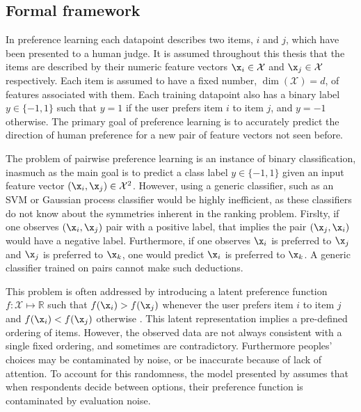 
\subsection{Formal framework\label{sec:prefKernel}}

In preference learning each datapoint describes two items, $i$ and $j$, which have been presented to a human judge. It is assumed throughout this thesis that the items are described by their numeric feature vectors $\x_i\in\mathcal{X}$ and $\x_j\in\mathcal{X}$ respectively. Each item is assumed to have a fixed number, $\dim(\mathcal{X})=d$, of features associated with them. Each training datapoint also has a binary label $y\in\{-1,1\}$ such that $y=1$ if the user prefers item $i$ to item $j$, and $y=-1$ otherwise. The primary goal of preference learning is to accurately predict the direction of human preference for a new pair of feature vectors not seen before.

The problem of pairwise preference learning is an instance of binary classification, inasmuch as the main goal is to predict a class label $y\in\{-1,1\}$ given an input feature vector $(\x_i,\x_j)\in\mathcal{X}^2$. However, using a generic classifier, such as an SVM or Gaussian process classifier would be highly inefficient, as these classifiers do not know about the symmetries inherent in the ranking problem. Firslty, if one observes $(\x_i,\x_j)$ pair with a positive label, that implies the pair $(\x_j,\x_i)$ would have a negative label. Furthermore, if one observes $\x_i$ is preferred to $\x_j$ and $\x_j$ is preferred to $\x_k$, one would predict $\x_i$ is preferred to $\x_k$. A generic classifier trained on pairs cannot make such deductions.

This problem is often addressed by introducing a latent preference function $f:\mathcal{X}\mapsto \mathbb{R}$ such that
$f(\x_i) > f(\x_j)$ whenever the user prefers item $i$ to item $j$ and $f(\x_i) < f(\x_j)$ otherwise \citep{Chu2005}. This latent representation implies a pre-defined ordering of items. However, the observed data are not always consistent with a single fixed ordering, and sometimes are contradictory. Furthermore peoples' choices may be contaminated by noise, or be inaccurate because of lack of attention. To account for this randomness, the model presented by \citep{Chu2005} assumes that when respondents decide between options, their preference function is contaminated by evaluation noise.


